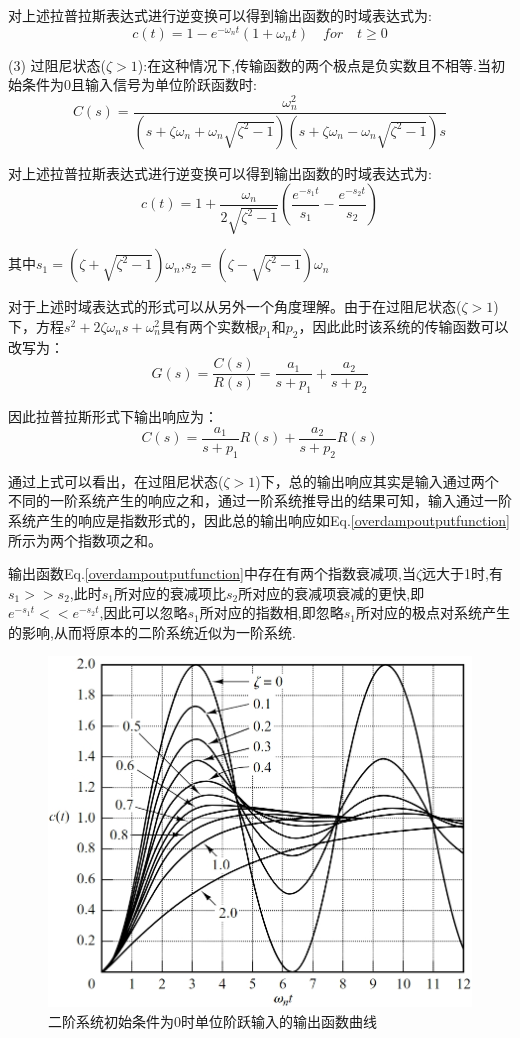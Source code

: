 \documentclass{article}
\numberwithin{equation}{section}
\numberwithin{figure}{section}
\begin{document}
对上述拉普拉斯表达式进行逆变换可以得到输出函数的时域表达式为:
\begin{equation}
    c(t)=1-e^{-\omega_nt}(1+\omega_nt) \quad for \quad t≥0
\end{equation}

(3) 过阻尼状态($\zeta>1$):在这种情况下,传输函数的两个极点是负实数且不相等.当初始条件为0且输入信号为单位阶跃函数时:
\begin{equation}
    C(s)=\frac{\omega_n^2}{(s+\zeta\omega_n+\omega_n\sqrt{\zeta^2-1})(s+\zeta\omega_n-\omega_n\sqrt{\zeta^2-1})s}
\end{equation}

对上述拉普拉斯表达式进行逆变换可以得到输出函数的时域表达式为:
\begin{equation}
    c(t)=1+\frac{\omega_n}{2\sqrt{\zeta^2-1}}(\frac{e^{-s_1t}}{s_1}-\frac{e^{-s_2t}}{s_2})\label{overdampoutputfunction}
\end{equation}

其中$s_1=(\zeta + \sqrt{\zeta^2-1})\omega_n$,$s_2=(\zeta - \sqrt{\zeta^2-1})\omega_n$

对于上述时域表达式的形式可以从另外一个角度理解。由于在过阻尼状态($\zeta>1$)下，方程$s^2+2\zeta \omega _ns+\omega _n^2$具有两个实数根$p_1$和$p_2$，因此此时该系统的传输函数可以改写为：
\begin{equation}
    G(s)=\frac{C(s)}{R(s)}=\frac{a_1}{s+p_1}+\frac{a_2}{s+p_2}
\end{equation}

因此拉普拉斯形式下输出响应为：
\begin{equation}
    C(s)=\frac{a_1}{s+p_1}R(s)+\frac{a_2}{s+p_2}R(s)
\end{equation}

通过上式可以看出，在过阻尼状态($\zeta>1$)下，总的输出响应其实是输入通过两个不同的一阶系统产生的响应之和，通过一阶系统推导出的结果可知，输入通过一阶系统产生的响应是指数形式的，因此总的输出响应如Eq.\ref{overdampoutputfunction}所示为两个指数项之和。

输出函数Eq.\ref{overdampoutputfunction}中存在有两个指数衰减项,当$\zeta$远大于1时,有$s_1>>s_2$,此时$s_1$所对应的衰减项比$s_2$所对应的衰减项衰减的更快,即$e^{-s_1t}<<e^{-s_2t}$,因此可以忽略$s_1$所对应的指数相,即忽略$s_1$所对应的极点对系统产生的影响,从而将原本的二阶系统近似为一阶系统.

\begin{figure}
    \centering
    \includegraphics[width=.5\textwidth]{Chapter5/2orderunitstepresponse.png} %
    \caption{二阶系统初始条件为0时单位阶跃输入的输出函数曲线} %
    \label{2orderunitstepresponse} %
\end{figure}
\end{document}
